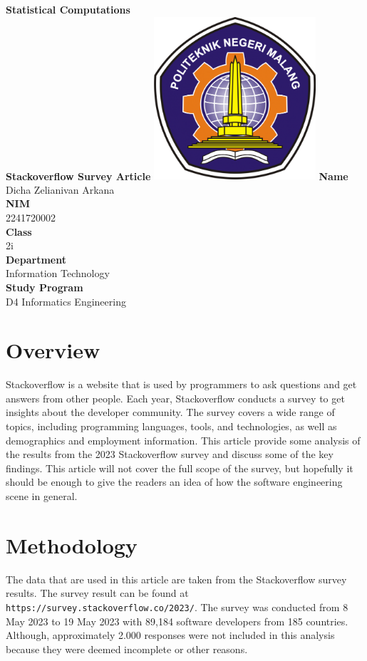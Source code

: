 \documentclass[12pt,titlepage]{article}
\newcommand{\vSubject}{Statistical Computations}
\newcommand{\vSubtitle}{Stackoverflow Survey Article}
\newcommand{\vName}{Dicha Zelianivan Arkana}
\newcommand{\vNIM}{2241720002}
\newcommand{\vClass}{2i}
\newcommand{\vDepartment}{Information Technology}
\newcommand{\vStudyProgram}{D4 Informatics Engineering}
\begin{document}
\begin{titlepage}
    \centering
    \vfill
    {\bfseries\LARGE
        \vSubject\\
        \vskip0.25cm
        \vSubtitle
    }
    \vfill
    \includegraphics[width=6cm]{images/polinema-logo.png}
    \vfill
    {
        \textbf{Name}\\
        \vName\\
        \vskip0.5cm
        \textbf{NIM}\\
        \vNIM\\
        \vskip0.5cm
        \textbf{Class}\\
        \vClass\\
        \vskip0.5cm
        \textbf{Department}\\
        \vDepartment\\
        \vskip0.5cm
        \textbf{Study Program}\\
        \vStudyProgram
    }
\end{titlepage}

\section{Overview}
Stackoverflow is a website that is used by programmers to ask questions and get answers from other people.
Each year, Stackoverflow conducts a survey to get insights about the developer community. The survey
covers a wide range of topics, including programming languages, tools, and technologies, as well as
demographics and employment information. This article provide some analysis of the results from the
2023 Stackoverflow survey and discuss some of the key findings. This article will not cover
the full scope of the survey, but hopefully it should be enough to give the readers an idea
of how the software engineering scene in general.

\section{Methodology}
The data that are used in this article are taken from the Stackoverflow survey results. The survey
result can be found at \texttt{https://survey.stackoverflow.co/2023/}. The survey was conducted from
8 May 2023 to 19 May 2023 with 89,184 software developers from 185 countries. Although, approximately 
2.000 responses were not included in this analysis because they were deemed incomplete or other
reasons.
\end{document}
